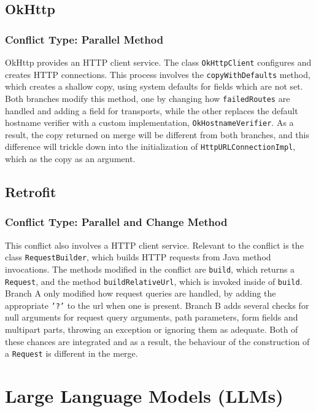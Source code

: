 \subsection{OkHttp}

\subsubsection{Conflict Type: Parallel Method}

OkHttp provides an HTTP client service. The class \texttt{OkHttpClient} configures and creates HTTP connections. This process involves
the \texttt{copyWithDefaults} method, which creates a shallow copy, using system defaults for fields which are not set. Both branches
modify this method, one by changing how \texttt{failedRoutes} are handled and adding a field for transports, while the other replaces
the default hostname verifier with a custom implementation, \texttt{OkHostnameVerifier}. As a result, the copy returned on merge will
be different from both branches, and this difference will trickle down into the initialization of \texttt{HttpURLConnectionImpl}, which
as the copy as an argument.

\subsection{Retrofit}

\subsubsection{Conflict Type: Parallel and Change Method}

This conflict also involves a HTTP client service. Relevant to the conflict is the class \texttt{RequestBuilder}, which builds HTTP requests from Java method invocations. The methods modified
in the conflict are \texttt{build}, which returns a \texttt{Request}, and the method \texttt{buildRelativeUrl}, which is invoked inside of \texttt{build}.
Branch A only modified how request queries are handled, by adding the appropriate \texttt{'?'} to the url when one is present.
Branch B adds several checks for null arguments for request query arguments, path parameters, form fields and multipart parts, throwing an exception or ignoring them as adequate.
Both of these chances are integrated and as a result, the behaviour of the construction of a \texttt{Request} is different in the merge.

\section{Large Language Models (LLMs)}

